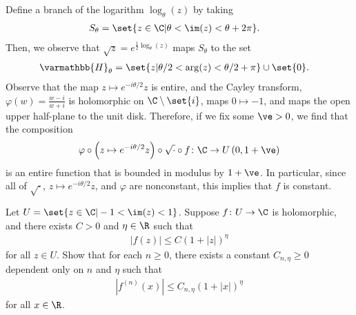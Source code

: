 \documentclass[10pt]{mypackage}
\renewcommand*{\mathbb}[1]{\varmathbb{#1}}
\begin{document}
\begin{solution}
\begin{enumerate}[(a)]
      Define a branch of the logarithm $\log_{\theta}(z)$ by taking
      \begin{align*}
        S_{\theta} &= \set{z\in \C | \theta < \im(z) < \theta + 2\pi}.
      \end{align*}
      Then, we observe that $\sqrt{z} = e^{\frac{1}{2}\log_{\theta}(z)}$ maps $S_{\theta}$ to the set
      \begin{align*}
        \mathbb{H}_{\theta} &= \set{z | \theta/2 < \arg(z) < \theta/2 + \pi} \cup \set{0}.
      \end{align*}
      Observe that the map $z\mapsto e^{-i\theta/2}z$ is entire, and the Cayley transform, $\varphi(w) = \frac{w-i}{w+i}$ is holomorphic on $\C\setminus \set{i}$, maps $0\mapsto -1$, and maps the open upper half-plane to the unit disk. Therefore, if we fix some $\ve > 0$, we find that the composition
      \begin{align*}
        \varphi\circ \left( z\mapsto e^{-i\theta/2}z \right) \circ \sqrt{\cdot}\circ f\colon \C\rightarrow U\left( 0, 1 + \ve \right)
      \end{align*}
      is an entire function that is bounded in modulus by $ 1 + \ve $. In particular, since all of $\sqrt{\cdot}$, $z\mapsto e^{-i\theta/2}z$, and $\varphi$ are nonconstant, this implies that $f$ is constant.
  \end{enumerate}
\end{solution}
\begin{problem}[Problem 4]
  Let $U = \set{z\in \C | -1 < \im(z) < 1}$. Suppose $f\colon U\rightarrow \C$ is holomorphic, and there exists $C > 0$ and $ \eta\in \R $ such that
  \begin{align*}
    \left\vert f(z) \right\vert \leq C\left( 1 + \left\vert z \right\vert \right)^{\eta}
  \end{align*}
  for all $z\in U$. Show that for each $n \geq 0$, there exists a constant $ C_{n,\eta} \geq 0 $ dependent only on $n$ and $\eta$ such that
  \begin{align*}
    \left\vert f^{(n)}(x) \right\vert \leq C_{n,\eta} \left( 1 + \left\vert x \right\vert \right)^{\eta}
  \end{align*}
  for all $x\in \R$.
\end{problem}
\end{document}
